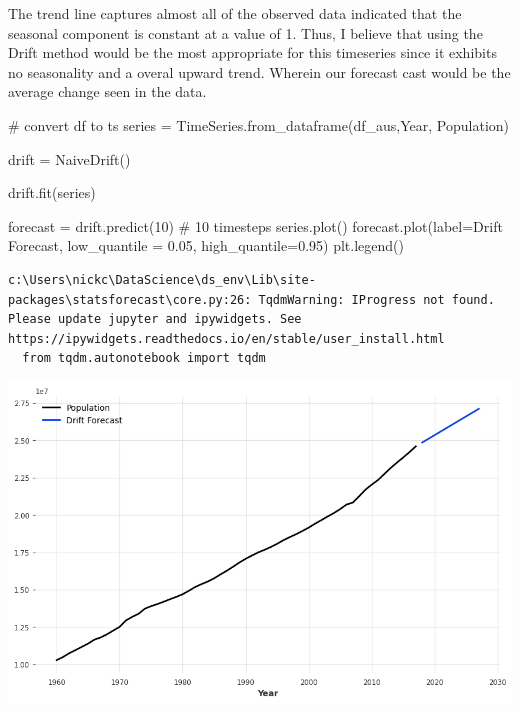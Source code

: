 \documentclass[
  11pt,
]{article}
\newenvironment{Shaded}{\begin{snugshade}}{\end{snugshade}}
\newcommand{\CommentTok}[1]{\textcolor[rgb]{0.37,0.37,0.37}{#1}}
\newcommand{\DecValTok}[1]{\textcolor[rgb]{0.68,0.00,0.00}{#1}}
\newcommand{\FloatTok}[1]{\textcolor[rgb]{0.68,0.00,0.00}{#1}}
\newcommand{\NormalTok}[1]{\textcolor[rgb]{0.00,0.23,0.31}{#1}}
\newcommand{\OperatorTok}[1]{\textcolor[rgb]{0.37,0.37,0.37}{#1}}
\newcommand{\StringTok}[1]{\textcolor[rgb]{0.13,0.47,0.30}{#1}}
\begin{document}
The trend line captures almost all of the observed data indicated that
the seasonal component is constant at a value of 1. Thus, I believe that
using the Drift method would be the most appropriate for this timeseries
since it exhibits no seasonality and a overal upward trend. Wherein our
forecast cast would be the average change seen in the data.

\begin{Shaded}
\begin{Highlighting}[]
\CommentTok{\# convert df to ts }
\NormalTok{series }\OperatorTok{=}\NormalTok{ TimeSeries.from\_dataframe(df\_aus,}\StringTok{\textquotesingle{}Year\textquotesingle{}}\NormalTok{, }\StringTok{\textquotesingle{}Population\textquotesingle{}}\NormalTok{)}
\end{Highlighting}
\end{Shaded}

\begin{Shaded}
\begin{Highlighting}[]
\NormalTok{drift }\OperatorTok{=}\NormalTok{ NaiveDrift()}

\NormalTok{drift.fit(series)}

\NormalTok{forecast }\OperatorTok{=}\NormalTok{ drift.predict(}\DecValTok{10}\NormalTok{) }\CommentTok{\# 10 timesteps}
\NormalTok{series.plot()}
\NormalTok{forecast.plot(label}\OperatorTok{=}\StringTok{\textquotesingle{}Drift Forecast\textquotesingle{}}\NormalTok{, low\_quantile }\OperatorTok{=} \FloatTok{0.05}\NormalTok{, high\_quantile}\OperatorTok{=}\FloatTok{0.95}\NormalTok{)}
\NormalTok{plt.legend()}
\end{Highlighting}
\end{Shaded}

\begin{verbatim}
c:\Users\nickc\DataScience\ds_env\Lib\site-packages\statsforecast\core.py:26: TqdmWarning: IProgress not found. Please update jupyter and ipywidgets. See https://ipywidgets.readthedocs.io/en/stable/user_install.html
  from tqdm.autonotebook import tqdm
\end{verbatim}

\includegraphics{hw3_files/figure-pdf/cell-9-output-2.png}
\end{document}
